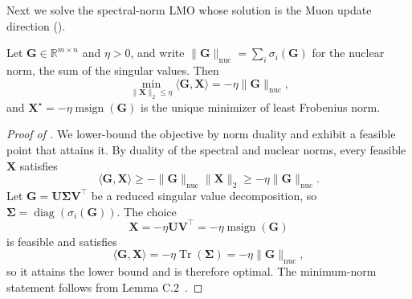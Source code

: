 \documentclass[11pt]{article}
\newcommand{\mat}[1]{\bm{#1}}
\DeclareMathOperator{\diag}{diag}
\DeclareMathOperator{\Tr}{Tr}
\newcommand{\ip}[1]{\langle #1 \rangle}
\DeclareMathOperator{\msign}{msign}          %
\newcommand{\norm}[1]{\| #1\|}
\begin{document}
Next we solve the spectral-norm LMO whose solution is the Muon update direction ().
\begin{lemma}\label{lem:muon-lmo}
Let $\mat{G}\in\mathbb{R}^{m\times n}$ and $\eta>0$, and write
$\norm{\mat{G}}_{\mathrm{nuc}}=\sum_i\sigma_i(\mat{G})$ for the nuclear norm, the sum of the
singular values. Then
\[
    \min_{\norm{\mat{X}}_2\leq \eta}\ip{\mat{G},\mat{X}}
    =
    -\eta\norm{\mat{G}}_{\mathrm{nuc}},
\]
and $\mat{X}^\star = -\eta\msign(\mat{G})$ is the unique minimizer of least Frobenius norm.
\end{lemma}

\begin{proof}[Proof of ]
We lower-bound the objective by norm duality and exhibit a feasible point that
attains it. By duality of the spectral and nuclear norms, every feasible $\mat{X}$
satisfies
\[
    \ip{\mat{G},\mat{X}}
    \geq
    -\norm{\mat{G}}_{\mathrm{nuc}}\norm{\mat{X}}_2
    \geq
    -\eta\norm{\mat{G}}_{\mathrm{nuc}}.
\]
Let $\mat{G}=\mat{U}\mat{\Sigma} \mat{V}^\top$ be a reduced singular value decomposition, so
$\mat{\Sigma}=\diag(\sigma_i(\mat{G}))$. The choice
\[
    \mat{X}=-\eta \mat{U}\mat{V}^\top=-\eta\msign(\mat{G})
\]
is feasible and satisfies
\[
    \ip{\mat{G},\mat{X}}
    =
    -\eta\Tr(\mat{\Sigma})
    =
    -\eta\norm{\mat{G}}_{\mathrm{nuc}},
\]
so it attains the lower bound and is therefore optimal. The minimum-norm
statement follows from Lemma C.2~\cite{parshakova2026muon}.
\end{proof}
\end{document}
